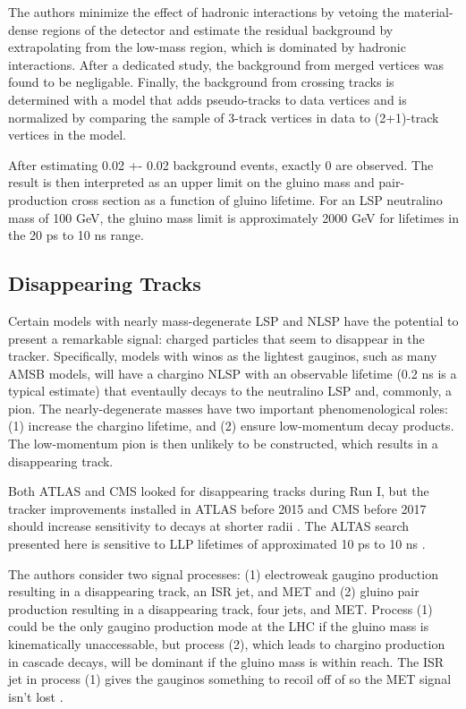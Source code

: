 \documentclass[12pt]{article}
\begin{document}
    The authors minimize the effect of hadronic interactions by vetoing the material-dense regions of the detector and estimate the residual background by extrapolating from the low-mass region, which is dominated by hadronic interactions. After a dedicated study, the background from merged vertices was found to be negligable. Finally, the background from crossing tracks is determined with a model that adds pseudo-tracks to data vertices and is normalized by comparing the sample of 3-track vertices in data to (2+1)-track vertices in the model.

    After estimating 0.02 +- 0.02 background events, exactly 0 are observed. The result is then interpreted as an upper limit on the gluino mass and pair-production cross section as a function of gluino lifetime. For an LSP neutralino mass of 100 GeV, the gluino mass limit is approximately 2000 GeV for lifetimes in the 20 ps to 10 ns range. 

\subsection{Disappearing Tracks}
    Certain models with nearly mass-degenerate LSP and NLSP have the potential to present a remarkable signal: charged particles that seem to disappear in the tracker. Specifically, models with winos as the lightest gauginos, such as many AMSB models, will have a chargino NLSP with an observable lifetime (0.2 ns is a typical estimate) that eventaully decays to the neutralino LSP and, commonly, a pion. The nearly-degenerate masses have two important phenomenological roles: (1) increase the chargino lifetime, and (2) ensure low-momentum decay products. The low-momentum pion is then unlikely to be constructed, which results in a disappearing track.

    Both ATLAS and CMS looked for disappearing tracks during Run I, but the tracker improvements installed in ATLAS before 2015 and CMS before 2017 should increase sensitivity to decays at shorter radii . The ALTAS search presented here is sensitive to LLP lifetimes of approximated 10 ps to 10 ns .

    The authors consider two signal processes: (1) electroweak gaugino production resulting in a disappearing track, an ISR jet, and MET and (2) gluino pair production resulting in a disappearing track, four jets, and MET. Process (1) could be the only gaugino production mode at the LHC if the gluino mass is kinematically unaccessable, but process (2), which leads to chargino production in cascade decays, will be dominant if the gluino mass is within reach. The ISR jet in process (1) gives the gauginos something to recoil off of so the MET signal isn't lost .
\end{document}
